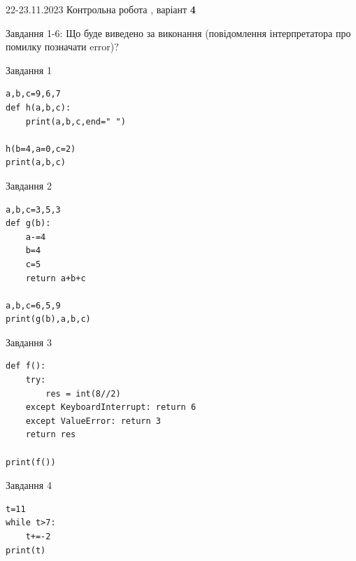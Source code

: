 \documentclass[12pt, ukrainian]{article}
\begin{document}
{{22-23.11.2023 Контрольна робота , варіант  \No \textbf { 4 }\par}}
{

Завдання 1-6: Що буде виведено за виконання (повідомлення інтерпретатора про помилку позначати error)?


\begin{minipage}[t]{9.7cm}                
{\begin{center}Завдання {1}\end{center}}
\begin{verbatim}
a,b,c=9,6,7
def h(a,b,c):
    print(a,b,c,end=" ")

h(b=4,a=0,c=2)
print(a,b,c)
\end{verbatim}     
\end{minipage}
\vline \hspace{8mm}
\begin{minipage}[t]{8.0cm}                
{\begin{center}Завдання {2}\end{center}}
\begin{verbatim}
a,b,c=3,5,3
def g(b):
    a-=4
    b=4
    c=5
    return a+b+c

a,b,c=6,5,9
print(g(b),a,b,c)
\end{verbatim}     
\end{minipage}

\vspace{15mm}
\begin{minipage}[t]{9.7cm}                
{\begin{center}Завдання {3}\end{center}}
\begin{verbatim}
def f():
    try:
        res = int(8//2)
    except KeyboardInterrupt: return 6
    except ValueError: return 3
    return res

print(f())
\end{verbatim}     
\end{minipage}
\vline \hspace{8mm}
\begin{minipage}[t]{8.0cm}                
{\begin{center}Завдання {4}\end{center}}
\begin{verbatim}
t=11
while t>7:
    t+=-2
print(t)
\end{verbatim}     
\end{minipage}

}
\end{document}
